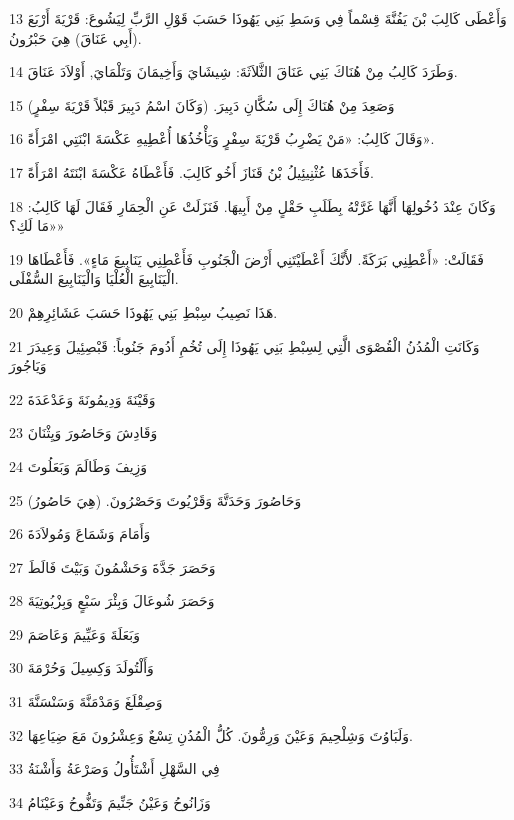 \par 13 وَأَعْطَى كَالِبَ بْنَ يَفُنَّةَ قِسْماً فِي وَسَطِ بَنِي يَهُوذَا حَسَبَ قَوْلِ الرَّبِّ لِيَشُوعَ: قَرْيَةَ أَرْبَعَ (أَبِي عَنَاقَ) هِيَ حَبْرُونُ.
\par 14 وَطَرَدَ كَالِبُ مِنْ هُنَاكَ بَنِي عَنَاقَ الثَّلاَثَةَ: شِيشَايَ وَأَخِيمَانَ وَتَلْمَايَ, أَوْلاَدَ عَنَاقَ.
\par 15 وَصَعِدَ مِنْ هُنَاكَ إِلَى سُكَّانِ دَبِيرَ. (وَكَانَ اسْمُ دَبِيرَ قَبْلاً قَرْيَةَ سِفْرٍ)
\par 16 وَقَالَ كَالِبُ: «مَنْ يَضْرِبُ قَرْيَةَ سِفْرٍ وَيَأْخُذُهَا أُعْطِيهِ عَكْسَةَ ابْنَتِي امْرَأَةً».
\par 17 فَأَخَذَهَا عُثْنِيئِيلُ بْنُ قَنَازَ أَخُو كَالِبَ. فَأَعْطَاهُ عَكْسَةَ ابْنَتَهُ امْرَأَةً.
\par 18 وَكَانَ عِنْدَ دُخُولِهَا أَنَّهَا غَرَّتْهُ بِطَلَبِ حَقْلٍ مِنْ أَبِيهَا. فَنَزَلَتْ عَنِ الْحِمَارِ فَقَالَ لَهَا كَالِبُ: «مَا لَكِ؟»
\par 19 فَقَالَتْ: «أَعْطِنِي بَرَكَةً. لأَنَّكَ أَعْطَيْتَنِي أَرْضَ الْجَنُوبِ فَأَعْطِنِي يَنَابِيعَ مَاءٍ». فَأَعْطَاهَا الْيَنَابِيعَ الْعُلْيَا وَالْيَنَابِيعَ السُّفْلَى.
\par 20 هَذَا نَصِيبُ سِبْطِ بَنِي يَهُوذَا حَسَبَ عَشَائِرِهِمْ.
\par 21 وَكَانَتِ الْمُدُنُ الْقُصْوَى الَّتِي لِسِبْطِ بَنِي يَهُوذَا إِلَى تُخُمِ أَدُومَ جَنُوباً: قَبْصِئِيلَ وَعِيدَرَ وَيَاجُورَ
\par 22 وَقَيْنَةَ وَدِيمُونَةَ وَعَدْعَدَةَ
\par 23 وَقَادِشَ وَحَاصُورَ وَيِثْنَانَ
\par 24 وَزِيفَ وَطَالَمَ وَبَعَلُوتَ
\par 25 وَحَاصُورَ وَحَدَتَّةَ وَقَرْيُوتَ وَحَصْرُونَ. (هِيَ حَاصُورُ)
\par 26 وَأَمَامَ وَشَمَاعَ وَمُولاَدَةَ
\par 27 وَحَصَرَ جَدَّةَ وَحَشْمُونَ وَبَيْتَ فَالَطَ
\par 28 وَحَصَرَ شُوعَالَ وَبِئْرَ سَبْعٍ وَبِزْيُوتِيَةَ
\par 29 وَبَعَلَةَ وَعَيِّيمَ وَعَاصَمَ
\par 30 وَأَلْتُولَدَ وَكِسِيلَ وَحُرْمَةَ
\par 31 وَصِقْلَغَ وَمَدْمَنَّةَ وَسَنْسَنَّةَ
\par 32 وَلَبَاوُتَ وَشِلْحِيمَ وَعَيْنَ وَرِمُّونَ. كُلُّ الْمُدُنِ تِسْعٌ وَعِشْرُونَ مَعَ ضِيَاعِهَا.
\par 33 فِي السَّهْلِ أَشْتَأُولُ وَصَرْعَةُ وَأَشْنَةُ
\par 34 وَزَانُوحُ وَعَيْنُ جَنِّيمَ وَتَفُّوحُ وَعَيْنَامُ
